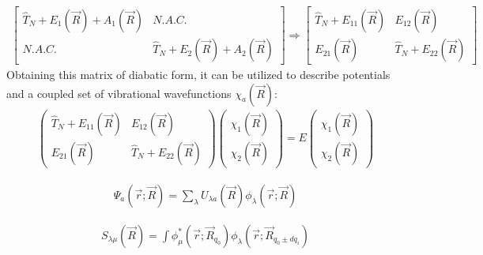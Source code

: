 \documentclass[letterpaper, 12pt, oneside]{report}
\begin{document}
\begin{equation}\label{eq:atodmatrix}
    \begin{split}
        \begin{bmatrix}
            \hat{T}_N + E_{1}(\Vec{R}) + A_{1}(\Vec{R}) & N.A.C.\\
            N.A.C.& \hat{T}_N + E_{2}{(\Vec{R}) + A_{2}(\Vec{R})}
        \end{bmatrix}
        \Rightarrow
        \begin{bmatrix}
            \hat{T}_{N} + E_{11}(\Vec{R}) & E_{12}(\Vec{R}) \\ 
            E_{21}(\Vec{R}) & \hat{T}_{N} + E_{22}{(\Vec{R})}
        \end{bmatrix}
    \end{split}
\end{equation}
%
Obtaining this matrix of diabatic form, it can be utilized to describe potentials and a coupled set of vibrational wavefunctions $\chi_a(\Vec{R})$:
\begin{equation} 
    \begin{split}
        \begin{pmatrix}
            \hat{T}_{N} + E_{11}(\Vec{R}) & E_{12}(\Vec{R}) \\ 
            E_{21}(\Vec{R}) & \hat{T}_{N} + E_{22}{(\Vec{R})}
        \end{pmatrix}
        \begin{pmatrix}
            \chi_{1}(\Vec{R}) \\ 
            \chi_{2}(\Vec{R})
        \end{pmatrix} 
        = E
        \begin{pmatrix}
            \chi_{1}(\Vec{R}) \\ 
            \chi_{2}(\Vec{R})
        \end{pmatrix} 
    \end{split}
\end{equation}

\begin{equation}\label{eq:diabaticstates}
    \begin{split}
            \Psi_{a}(\Vec{r};\Vec{R}) = \sum_{\lambda} U_{\lambda a} (\Vec{R}) \phi_{\lambda} (\Vec{r};\Vec{R})
    \end{split}
\end{equation}

\begin{equation}\label{eq:overlapmatrix}
    \begin{split}
            S_{\lambda \mu}(\Vec{R}) = \int \phi_{\mu}^{*} (\Vec{r};\Vec{R}_{q_0}) \phi_{\lambda} (\Vec{r};\Vec{R}_{q_0 \pm dq_{i}})
    \end{split}
\end{equation}
\end{document}
